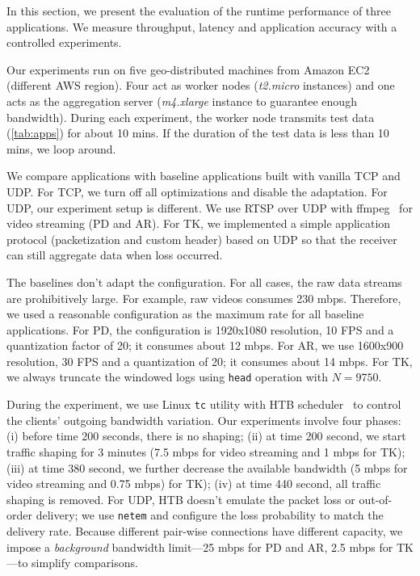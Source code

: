 
In this section, we present the evaluation of the runtime performance of three
applications. We measure throughput, latency and application accuracy with a
controlled experiments.

Our experiments run on five geo-distributed machines from Amazon EC2 (different
AWS region). Four act as worker nodes (\textit{t2.micro} instances) and one acts
as the aggregation server (\textit{m4.xlarge} instance to guarantee enough
bandwidth). During each experiment, the worker node transmits test data
(\autoref{tab:apps}) for about 10 mins. If the duration of the test data is less
than 10 mins, we loop around.

We compare \sysname{} applications with baseline applications built with vanilla
TCP and UDP. For TCP, we turn off all optimizations and disable the
adaptation. For UDP, our experiment setup is different. We use RTSP over UDP
with ffmpeg~\cite{bellard2012ffmpeg} for video streaming (PD and AR). For TK, we
implemented a simple application protocol (packetization and custom header)
based on UDP so that the receiver can still aggregate data when loss occurred.

The baselines don't adapt the configuration. For all cases, the raw data streams
are prohibitively large. For example, raw videos consumes 230 mbps. Therefore,
we used a reasonable configuration as the maximum rate for all baseline
applications. For PD, the configuration is 1920x1080 resolution, 10 FPS and a
quantization factor of 20; it consumes about 12 mbps. For AR, we use 1600x900
resolution, 30 FPS and a quantization of 20; it consumes about 14 mbps. For TK,
we always truncate the windowed logs using \texttt{head} operation with
$N=9750$.

During the experiment, we use Linux \texttt{tc} utility with HTB
scheduler~\cite{lartc, htb} to control the clients' outgoing bandwidth
variation. Our experiments involve four phases: (i) before time 200 seconds,
there is no shaping; (ii) at time 200 second, we start traffic shaping for 3
minutes (7.5 mbps for video streaming and 1 mbps for TK); (iii) at time 380
second, we further decrease the available bandwidth (5 mbps for video streaming
and 0.75 mbps) for TK); (iv) at time 440 second, all traffic shaping is
removed. For UDP, HTB doesn't emulate the packet loss or out-of-order delivery;
we use \texttt{netem} and configure the loss probability to match the delivery
rate. Because different pair-wise connections have different capacity, we impose
a \textit{background} bandwidth limit---25 mbps for PD and AR, 2.5 mbps for
TK---to simplify comparisons.

